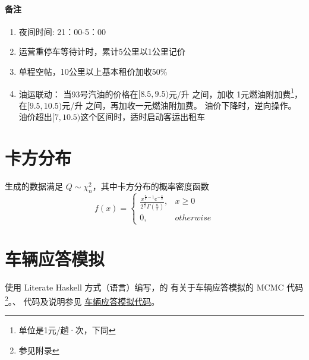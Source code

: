 \documentclass{ctexart}
\begin{document}
    \paragraph{备注}
    \begin{enumerate}
        \item 夜间时间: 21：00-5：00
        \item 运营重停车等待计时，累计5公里以1公里记价
        \item 单程空帖，10公里以上基本租价加收$50\%$
        \item 油运联动：
        当93号汽油的价格在$[8.5,9.5)$元/升 之间，加收 1元燃油附加费\footnote{单位是1元/趟·次，下同}，
        在$[9.5,10.5)$元/升 之间，再加收一元燃油附加费。
        油价下降时，逆向操作。
        油价超出$[7,10.5)$这个区间时，适时启动客运出租车
    \end{enumerate}
    
    \section{卡方分布}
    \label{sec:chi2}
    生成的数据满足 $Q\sim\chi^2_n$，其中卡方分布的概率密度函数
    $$f(x)=\begin{cases}
    \frac{x^{\frac{n}{2}-1}e^{-\frac{x}{2}}}{2^{\frac{n}{2}}\Gamma(\frac{n}{2})} ,& x \geq 0\\
    0,& otherwise
    \end{cases}$$
    
    \section{车辆应答模拟}
    \label{sec:sumtaxi}
    使用 Literate Haskell 方式（语言）编写，的 有关于车辆应答模拟的 MCMC 代码\footnote{参见附录}。、
    代码及说明参见 \href{/b/sumo/T/20160813/code/sumtaxi.lhs}{车辆应答模拟代码}。
    
\end{document}
